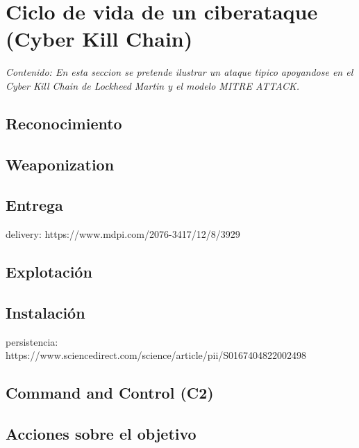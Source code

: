 \chapter{Ciclo de vida de un ciberataque (Cyber Kill Chain)}

\textit{Contenido: En esta seccion se pretende ilustrar un ataque tipico
apoyandose en el Cyber Kill Chain de Lockheed Martin y el modelo MITRE ATTACK.}
\vspace{1em}

\section{Reconocimiento}

\section{Weaponization}

\section{Entrega}

delivery: https://www.mdpi.com/2076-3417/12/8/3929

\section{Explotación}

\section{Instalación}

persistencia: https://www.sciencedirect.com/science/article/pii/S0167404822002498

\section{Command and Control (C2)}

\section{Acciones sobre el objetivo}